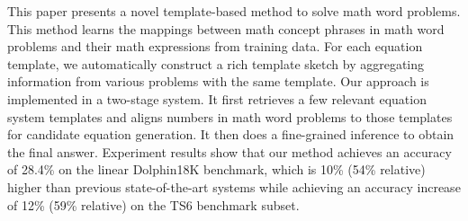 This paper presents a novel template-based method to solve math word problems. This method learns the mappings between math concept phrases in math word problems and their math expressions from training data. For each equation template, we automatically construct a rich template sketch by aggregating information from various problems with the same template. Our approach is implemented in a two-stage system. It first retrieves a few relevant equation system templates and aligns numbers in math word problems to those templates for candidate equation generation. It then does a fine-grained inference to obtain the final answer. Experiment results show that our method achieves an accuracy of 28.4\% on the linear Dolphin18K benchmark, which is 10\% (54\% relative) higher than previous state-of-the-art systems while achieving an accuracy increase of 12\% (59\% relative) on the TS6 benchmark subset.

